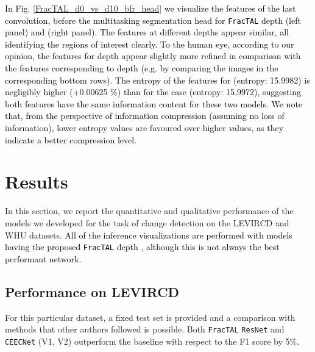 \documentclass[times, 5p]{elsarticle}
\def \FracTAL {\texttt{FracTAL} }
\newcommand{\ceecnet}{\texttt{CEECNet}}
\begin{document}
\textcolor{black}{
In Fig. \ref{FracTAL_d0_vs_d10_bfr_head} we visualize the features of the last convolution, before the multitasking segmentation head for \FracTAL depth  (left panel) and  (right panel). The features at different depths appear similar, all identifying the regions of interest clearly. To the human eye, according to our opinion, the features for depth  appear slightly more refined in comparison with the features corresponding to depth  (e.g. by comparing the images in the corresponding bottom rows). The entropy of the features for   (entropy: 15.9982) is negligibly higher (+0.00625 \%) than for  the case  (entropy: 15.9972), suggesting both features have the same information content for these two models. We note that, from the perspective of information compression (assuming no loss of information), lower entropy values are favoured over higher values, as they indicate a better compression level.}



\section{Results}
\label{section_results}

In this section, we report the quantitative and qualitative  performance of the models we developed for the task of change detection on the LEVIRCD \citep{rs12101662} and WHU \citep{Ji2019FullyCN} datasets.
 \textcolor{black}{All of the inference visualizations are performed with models having the proposed \FracTAL depth , although this is not always the best performant network.}

\subsection{Performance on LEVIRCD}
\label{levircd_performance_section}

For this particular dataset, a fixed test set is provided  and a comparison with methods that other authors followed is possible. Both \FracTAL{} \texttt{ResNet} and \ceecnet{} (V1, V2) outperform the baseline \citep{rs12101662} with respect to the F1 score by 5\%.   
\end{document}
